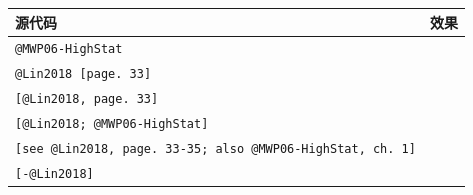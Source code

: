 \documentclass[]{article}
\begin{document}
\begin{longtable}[]{@{}ll@{}}
\toprule
\begin{minipage}[b]{0.47\columnwidth}\raggedright
源代码\strut
\end{minipage} & \begin{minipage}[b]{0.47\columnwidth}\raggedright
效果\strut
\end{minipage}\tabularnewline
\midrule
\endhead
\begin{minipage}[t]{0.47\columnwidth}\raggedright
\texttt{@MWP06-HighStat}\strut
\end{minipage} & \begin{minipage}[t]{0.47\columnwidth}\raggedright
\citet{MWP06-HighStat}\strut
\end{minipage}\tabularnewline
\begin{minipage}[t]{0.47\columnwidth}\raggedright
\texttt{@Lin2018\ {[}page.\ 33{]}}\strut
\end{minipage} & \begin{minipage}[t]{0.47\columnwidth}\raggedright
\citet[page. 33]{Lin2018}\strut
\end{minipage}\tabularnewline
\begin{minipage}[t]{0.47\columnwidth}\raggedright
\texttt{{[}@Lin2018,\ page.\ 33{]}}\strut
\end{minipage} & \begin{minipage}[t]{0.47\columnwidth}\raggedright
\citep[page. 33]{Lin2018}\strut
\end{minipage}\tabularnewline
\begin{minipage}[t]{0.47\columnwidth}\raggedright
\texttt{{[}@Lin2018;\ @MWP06-HighStat{]}}\strut
\end{minipage} & \begin{minipage}[t]{0.47\columnwidth}\raggedright
\citep{Lin2018, MWP06-HighStat}\strut
\end{minipage}\tabularnewline
\begin{minipage}[t]{0.47\columnwidth}\raggedright
\texttt{{[}see\ @Lin2018,\ page.\ 33-35;\ also\ @MWP06-HighStat,\ ch.\ 1{]}}\strut
\end{minipage} & \begin{minipage}[t]{0.47\columnwidth}\raggedright
\citetext{\citealp[see][page. 33-35]{Lin2018}; \citealp[also][ch.~1]{MWP06-HighStat}}\strut
\end{minipage}\tabularnewline
\begin{minipage}[t]{0.47\columnwidth}\raggedright
\texttt{{[}-@Lin2018{]}}\strut
\end{minipage} & \begin{minipage}[t]{0.47\columnwidth}\raggedright
\citeyearpar{Lin2018}\strut
\end{minipage}\tabularnewline
\bottomrule
\end{longtable}
\end{document}
